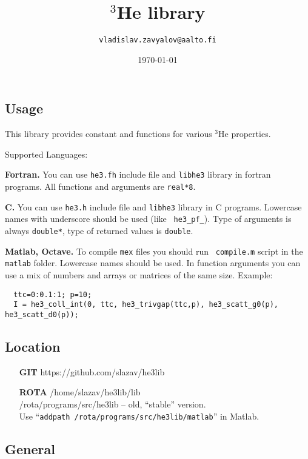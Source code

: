 \documentclass[a4paper]{article}
\begin{document}
\title{$^3$He library}
\date{\today}
\author{\tt vladislav.zavyalov@aalto.fi}
\maketitle

\subsection*{Usage}

This library provides constant and functions for various $^3$He properties.

\noindent Supported Languages:

{\bf Fortran.}
You can use {\tt he3.fh} include file and {\tt libhe3} library in
fortran programs. All functions and arguments are {\tt real*8}.

{\bf C.} You can use {\tt he3.h} include file and {\tt libhe3} library
in C programs. Lowercase names with underscore should be used (like {\tt
he3\_pf\_}). Type of arguments is always {\tt double*}, type of returned
values is {\tt double}.

{\bf Matlab, Octave.} To compile {\tt mex} files you should run {\tt
compile.m} script in the {\tt matlab} folder. Lowercase names should be
used. In function arguments you can use a mix of numbers and arrays or
matrices of the same size. Example:
\begin{verbatim}
  ttc=0:0.1:1; p=10;
  I = he3_coll_int(0, ttc, he3_trivgap(ttc,p), he3_scatt_g0(p), he3_scatt_d0(p));
\end{verbatim}

\subsection*{Location}
\begin{itemize}
\item[\bf GIT]  https://github.com/slazav/he3lib
\item[\bf ROTA]
/home/slazav/he3lib/lib\\
/rota/programs/src/he3lib -- old, ``stable'' version.\\
Use ``{\tt addpath /rota/programs/src/he3lib/matlab}'' in Matlab.
\end{itemize}

\subsection*{General}
\end{document}
